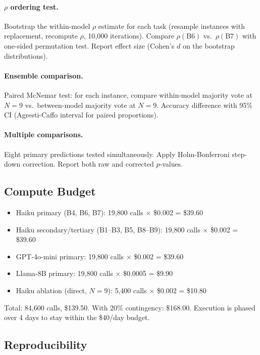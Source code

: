 \documentclass{article}
\theoremstyle{definition}
\theoremstyle{remark}
\begin{document}
\paragraph{$\rho$ ordering test.}
Bootstrap the within-model $\rho$ estimate for each task (resample instances with replacement, recompute $\rho$, 10{,}000 iterations).
Compare $\rho(\text{B6})$ vs.\ $\rho(\text{B7})$ with one-sided permutation test.
Report effect size (Cohen's $d$ on the bootstrap distributions).

\paragraph{Ensemble comparison.}
Paired McNemar test: for each instance, compare within-model majority vote at $N = 9$ vs.\ between-model majority vote at $N = 9$.
Accuracy difference with 95\% CI (Agresti-Caffo interval for paired proportions).

\paragraph{Multiple comparisons.}
Eight primary predictions tested simultaneously.
Apply Holm-Bonferroni step-down correction.
Report both raw and corrected $p$-values.

\subsection{Compute Budget}

\begin{itemize}[leftmargin=*,itemsep=1pt]
    \item Haiku primary (B4, B6, B7): 19{,}800 calls $\times$ \$0.002 = \$39.60
    \item Haiku secondary/tertiary (B1--B3, B5, B8--B9): 19{,}800 calls $\times$ \$0.002 = \$39.60
    \item GPT-4o-mini primary: 19{,}800 calls $\times$ \$0.002 = \$39.60
    \item Llama-8B primary: 19{,}800 calls $\times$ \$0.0005 = \$9.90
    \item Haiku ablation (direct, $N = 9$): 5{,}400 calls $\times$ \$0.002 = \$10.80
\end{itemize}
Total: 84{,}600 calls, \$139.50. With 20\% contingency: \$168.00.
Execution is phased over 4 days to stay within the \$40/day budget.

\subsection{Reproducibility}
\end{document}
